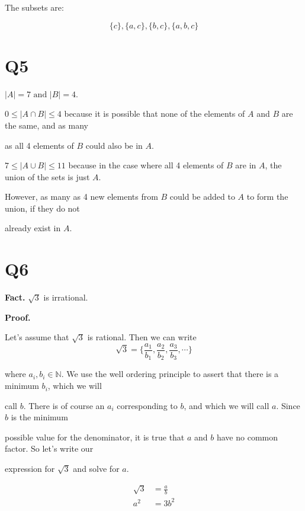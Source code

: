 \documentclass{article}
\begin{document}
The subsets are:

$$\{c\}, \{a, c\}, \{b, c\}, \{a, b, c\}$$


\section*{Q5}

$|A| = 7 \text{ and } |B| = 4$. 

\smallskip

$0 \leq |A \cap B| \leq 4$ because it is possible that none of the elements of $A$ and $B$ are the same, and as many 

as all 4 elements of $B$ could also be in $A$.

\smallskip

$7 \leq |A \cup B| \leq 11$ because in the case where all 4 elements of $B$ are in $A$, the union of the sets is just $A$. 

However, as many as 4 new elements from $B$ could be added to $A$ to form the union, if they do not 

already exist in $A$.



\section*{Q6}

\textbf{Fact.} $\sqrt{3}$ is irrational.

\smallskip

\noindent \textbf{Proof.}

Let's assume that $\sqrt{3}$ is rational. Then we can write $$\sqrt{3} = \Big\{ \frac{a_1}{b_1}, \frac{a_2}{b_2}, \frac{a_3}{b_3}, \cdots \Big\}$$

where $a_i, b_i \in \mathbb{N}.$ We use the well ordering principle to assert that there is a minimum $b_i$, which we will 

call $b$. There is of course an $a_i$ corresponding to $b$, and which we will call $a$. Since $b$ is the minimum 

possible value for the denominator, it is true that $a$ and $b$ have no common factor. So let's write our 

expression for $\sqrt{3}$ and solve for $a$.

\begin{align*}
\sqrt{3} &= \frac{a}{b} \\
a^2 &= 3b^2
\end{align*}
\end{document}
